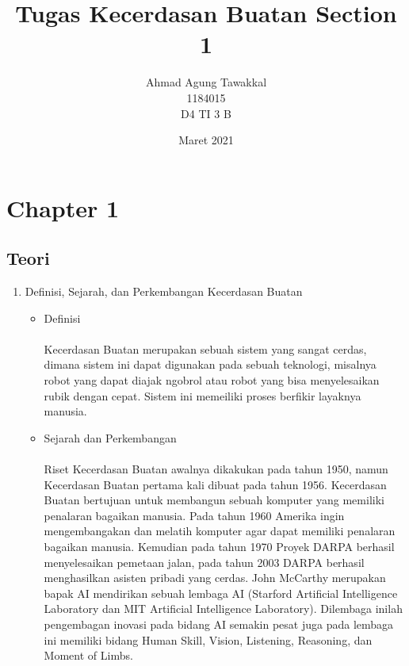 \documentclass{article}
\title{Tugas Kecerdasan Buatan Section 1}
\author{Ahmad Agung Tawakkal\\
        1184015\\
        D4 TI 3 B}
\date{Maret 2021}
\begin{document}
\maketitle

\newpage


\section{Chapter 1}
    \subsection{Teori}
        \begin{enumerate}
            \item Definisi, Sejarah, dan Perkembangan Kecerdasan Buatan
                \begin{itemize}
                    \item Definisi
                        \paragraph{}Kecerdasan Buatan merupakan sebuah sistem yang sangat cerdas, dimana sistem ini dapat digunakan pada sebuah teknologi, misalnya robot yang dapat diajak ngobrol atau robot yang bisa menyelesaikan rubik dengan cepat. Sistem ini memeiliki proses berfikir layaknya manusia.
                    \item Sejarah dan Perkembangan
                        \paragraph{}Riset Kecerdasan Buatan awalnya dikakukan pada tahun 1950, namun Kecerdasan Buatan pertama kali dibuat pada tahun 1956. Kecerdasan Buatan bertujuan untuk membangun sebuah komputer yang memiliki penalaran bagaikan manusia. Pada tahun 1960 Amerika ingin mengembangakan dan melatih komputer agar dapat memiliki penalaran bagaikan manusia. Kemudian pada tahun 1970 Proyek DARPA berhasil menyelesaikan pemetaan jalan, pada tahun 2003 DARPA berhasil menghasilkan asisten pribadi yang cerdas. John McCarthy merupakan bapak AI mendirikan sebuah lembaga AI (Starford Artificial Intelligence Laboratory dan MIT Artificial Intelligence Laboratory). Dilembaga inilah pengembagan inovasi pada bidang AI semakin pesat juga pada lembaga ini memiliki bidang Human Skill, Vision, Listening, Reasoning, dan Moment of Limbs.
                \end{itemize}
                

\end{enumerate}
\end{document}
